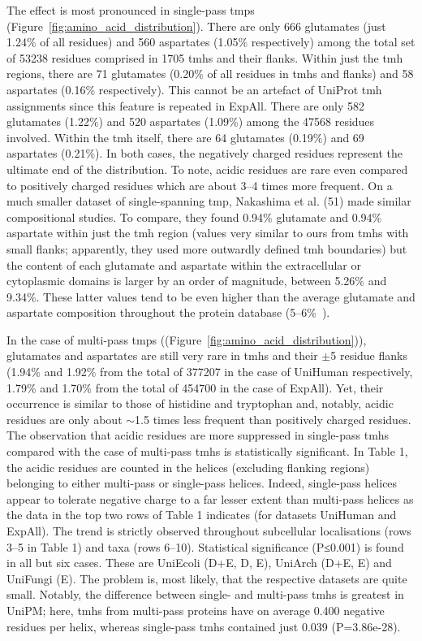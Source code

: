 The effect is most pronounced in single-pass \gls{tmp}s (Figure~\ref{fig:amino_acid_distribution}). There are only 666 glutamates (just 1.24\% of all residues) and 560 aspartates (1.05\% respectively) among the total set of 53238 residues comprised in 1705 \gls{tmh}s and their flanks. Within just the \gls{tmh} regions, there are 71 glutamates (0.20\% of all residues in \gls{tmh}s and flanks) and 58 aspartates (0.16\% respectively). This cannot be an artefact of UniProt \gls{tmh} assignments since this feature is repeated in ExpAll. There are only 582 glutamates (1.22\%) and 520 aspartates (1.09\%) among the 47568 residues involved. Within the \gls{tmh} itself, there are 64 glutamates (0.19\%) and 69 aspartates (0.21\%). In both cases, the negatively charged residues represent the ultimate end of the distribution. To note, acidic residues are rare even compared to positively charged residues which are about 3--4 times more frequent. On a much smaller dataset of single-spanning \gls{tmp}, Nakashima et al. (51) made similar compositional studies. To compare, they found 0.94\% glutamate and 0.94\% aspartate within just the \gls{tmh} region (values very similar to ours from \gls{tmh}s with small flanks; apparently, they used more outwardly defined \gls{tmh} boundaries) but the content of each glutamate and aspartate within the extracellular or cytoplasmic domains is larger by an order of magnitude, between 5.26\% and 9.34\%. These latter values tend to be even higher than the average glutamate and aspartate composition throughout the protein database (5--6\%~\cite{Nakashima1992}).

In the case of multi-pass \gls{tmp}s ((Figure~\ref{fig:amino_acid_distribution})), glutamates and aspartates are still very rare in \gls{tmh}s and their $\pm$5 residue flanks (1.94\% and 1.92\% from the total of 377207 in the case of UniHuman respectively, 1.79\% and 1.70\% from the total of 454700 in the case of ExpAll). Yet, their occurrence is similar to those of histidine and tryptophan and, notably, acidic residues are only about $\sim$1.5 times less frequent than positively charged residues. The observation that acidic residues are more suppressed in single-pass \gls{tmh}s compared with the case of multi-pass \gls{tmh}s is statistically significant. In Table 1, the acidic residues are counted in the helices (excluding flanking regions) belonging to either multi-pass or single-pass helices. Indeed, single-pass helices appear to tolerate negative charge to a far lesser extent than multi-pass helices as the data in the top two rows of Table 1 indicates (for datasets UniHuman and ExpAll). The trend is strictly observed throughout subcellular localisations (rows 3--5 in Table 1) and taxa (rows 6--10). Statistical significance (P≤0.001) is found in all but six cases. These are UniEcoli (D+E, D, E), UniArch (D+E, E) and UniFungi (E). The problem is, most likely, that the respective datasets are quite small. Notably, the difference between single- and multi-pass \gls{tmh}s is greatest in UniPM\@; here, \gls{tmh}s from multi-pass proteins have on average 0.400 negative residues per helix, whereas single-pass \gls{tmh}s contained just 0.039 (P=3.86e-28).

